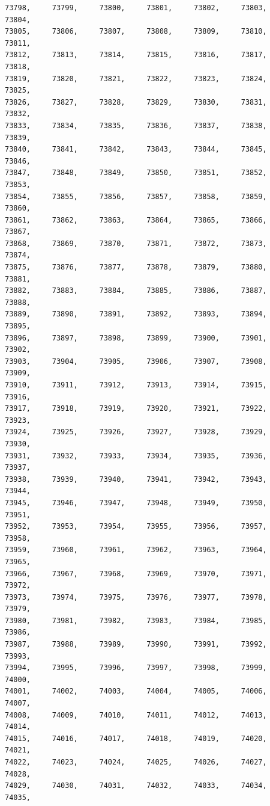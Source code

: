 \documentclass[a4paper,11pt]{report}
\begin{document}
\begin{verbatim}
73798,     73799,     73800,     73801,     73802,     73803,     73804,     
73805,     73806,     73807,     73808,     73809,     73810,     73811,     
73812,     73813,     73814,     73815,     73816,     73817,     73818,     
73819,     73820,     73821,     73822,     73823,     73824,     73825,     
73826,     73827,     73828,     73829,     73830,     73831,     73832,     
73833,     73834,     73835,     73836,     73837,     73838,     73839,     
73840,     73841,     73842,     73843,     73844,     73845,     73846,     
73847,     73848,     73849,     73850,     73851,     73852,     73853,     
73854,     73855,     73856,     73857,     73858,     73859,     73860,     
73861,     73862,     73863,     73864,     73865,     73866,     73867,     
73868,     73869,     73870,     73871,     73872,     73873,     73874,     
73875,     73876,     73877,     73878,     73879,     73880,     73881,     
73882,     73883,     73884,     73885,     73886,     73887,     73888,     
73889,     73890,     73891,     73892,     73893,     73894,     73895,     
73896,     73897,     73898,     73899,     73900,     73901,     73902,     
73903,     73904,     73905,     73906,     73907,     73908,     73909,     
73910,     73911,     73912,     73913,     73914,     73915,     73916,     
73917,     73918,     73919,     73920,     73921,     73922,     73923,     
73924,     73925,     73926,     73927,     73928,     73929,     73930,     
73931,     73932,     73933,     73934,     73935,     73936,     73937,     
73938,     73939,     73940,     73941,     73942,     73943,     73944,     
73945,     73946,     73947,     73948,     73949,     73950,     73951,     
73952,     73953,     73954,     73955,     73956,     73957,     73958,     
73959,     73960,     73961,     73962,     73963,     73964,     73965,     
73966,     73967,     73968,     73969,     73970,     73971,     73972,     
73973,     73974,     73975,     73976,     73977,     73978,     73979,     
73980,     73981,     73982,     73983,     73984,     73985,     73986,     
73987,     73988,     73989,     73990,     73991,     73992,     73993,     
73994,     73995,     73996,     73997,     73998,     73999,     74000,     
74001,     74002,     74003,     74004,     74005,     74006,     74007,     
74008,     74009,     74010,     74011,     74012,     74013,     74014,     
74015,     74016,     74017,     74018,     74019,     74020,     74021,     
74022,     74023,     74024,     74025,     74026,     74027,     74028,     
74029,     74030,     74031,     74032,     74033,     74034,     74035,     

\end{verbatim}
\end{document}
